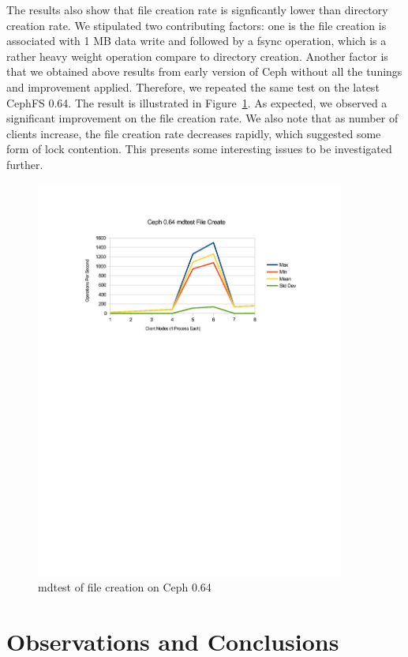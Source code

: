 \documentclass{article}
\begin{document}
The results also show that file creation rate is signficantly lower than
directory creation rate. We stipulated two contributing factors: one is the file
creation is associated with 1 MB data write and followed by a fsync operation,
which is a rather heavy weight operation compare to directory creation. Another
factor is that we obtained above results from early version of Ceph without all
the tunings and improvement applied. Therefore, we repeated the same test on the
latest CephFS 0.64. The result is illustrated in
Figure~\ref{fig:mdtest-064-file-create}. As expected, we observed a significant
improvement on the file creation rate. We also note that as number of clients
increase, the file creation rate decreases rapidly, which suggested some form of
lock contention. This presents some interesting issues to be investigated
further.

\begin{figure}[htb]
\centering
\includegraphics[width=4in]{mdtest-064-file-create}
\caption{mdtest of file creation on Ceph 0.64}
\label{fig:mdtest-064-file-create}
\end{figure}

\section{Observations and Conclusions}
\end{document}
